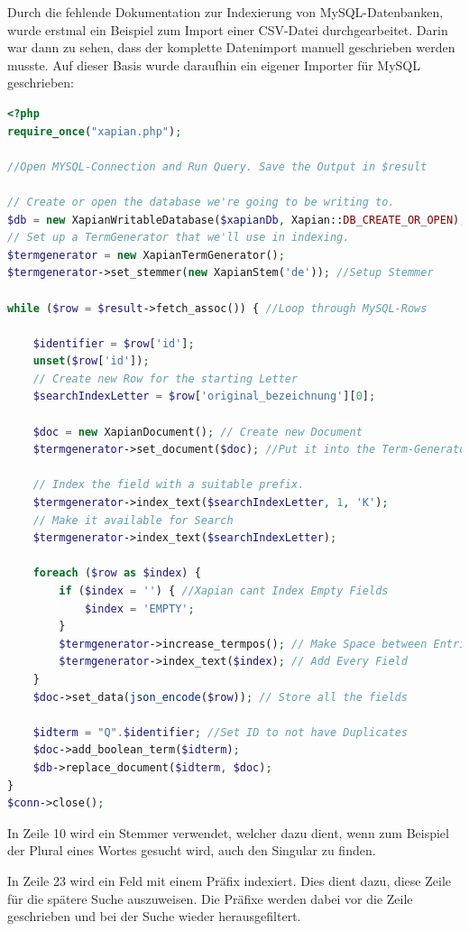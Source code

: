 Durch die fehlende Dokumentation zur Indexierung von MySQL-Datenbanken, wurde erstmal ein Beispiel zum Import einer CSV-Datei durchgearbeitet. Darin war dann zu sehen, dass der komplette Datenimport manuell geschrieben werden musste. Auf dieser Basis wurde daraufhin ein eigener Importer für MySQL geschrieben:
\newpage
\begin{lstlisting}[language=php, frame=single, label={lst:XapPhp}, morekeywords={type,uninvertible,indexed,stored,field,multiValued, name}, caption=Skript zur Indexierung der Daten in Xapian,captionpos=b] 
<?php
require_once("xapian.php");

//Open MYSQL-Connection and Run Query. Save the Output in $result

// Create or open the database we're going to be writing to.
$db = new XapianWritableDatabase($xapianDb, Xapian::DB_CREATE_OR_OPEN);
// Set up a TermGenerator that we'll use in indexing.
$termgenerator = new XapianTermGenerator();
$termgenerator->set_stemmer(new XapianStem('de')); //Setup Stemmer

while ($row = $result->fetch_assoc()) { //Loop through MySQL-Rows

	$identifier = $row['id'];
	unset($row['id']);
	// Create new Row for the starting Letter
	$searchIndexLetter = $row['original_bezeichnung'][0];

	$doc = new XapianDocument(); // Create new Document
	$termgenerator->set_document($doc); //Put it into the Term-Generator

	// Index the field with a suitable prefix.
	$termgenerator->index_text($searchIndexLetter, 1, 'K'); 
	// Make it available for Search
	$termgenerator->index_text($searchIndexLetter); 

	foreach ($row as $index) {
		if ($index = '') { //Xapian cant Index Empty Fields
			$index = 'EMPTY';
		}
		$termgenerator->increase_termpos(); // Make Space between Entries
		$termgenerator->index_text($index); // Add Every Field
	}
	$doc->set_data(json_encode($row)); // Store all the fields

	$idterm = "Q".$identifier; //Set ID to not have Duplicates
	$doc->add_boolean_term($idterm);
	$db->replace_document($idterm, $doc);
}
$conn->close();
\end{lstlisting}

In Zeile 10 wird ein Stemmer verwendet, welcher dazu dient, wenn zum Beispiel der Plural eines Wortes gesucht wird, auch den Singular zu finden.

In Zeile 23 wird ein Feld mit einem Präfix indexiert. Dies dient dazu, diese Zeile für die spätere Suche auszuweisen. Die Präfixe werden dabei vor die Zeile geschrieben und bei der Suche wieder herausgefiltert. 


